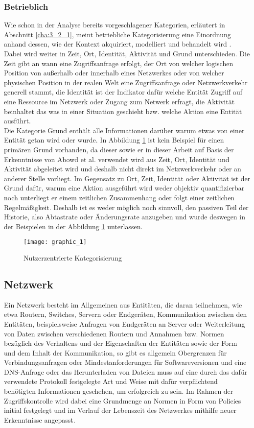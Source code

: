 \subsubsection{Betrieblich}
Wie schon in der Analyse bereits vorgeschlagener Kategorien, erläutert in Abschnitt \ref{cha:3_2_1}, meint betriebliche Kategorisierung  eine Einordnung anhand dessen, wie der Kontext akquiriert, modelliert und behandelt wird \cite{van2005context}.\\
Dabei wird weiter in Zeit, Ort, Identität, Aktivität und Grund unterschieden. Die Zeit gibt an wann eine Zugriffsanfrage erfolgt, der Ort von welcher logischen Position von außerhalb oder innerhalb eines Netzwerkes oder von welcher physischen Position in der realen Welt eine Zugriffsanfrage oder Netzwerkverkehr generell stammt, die Identität ist der Indikator dafür welche Entität Zugriff auf eine Ressource im Netzwerk oder Zugang zum Netwerk erfragt, die Aktivität beinhaltet das was in einer Situation geschieht bzw. welche Aktion eine Entität ausführt.\\
Die Kategorie Grund enthält alle Informationen darüber warum etwas von einer Entität getan wird oder wurde. In Abbildung \ref{Tax_1} ist kein Beispiel für einen primären Grund vorhanden, da dieser sowie er in dieser Arbeit auf Basis der Erkenntnisse von Abowd et al. \cite{abowd_towards_1999} verwendet wird aus Zeit, Ort, Identität und Aktivität abgeleitet wird und deshalb nicht direkt im Netzwerkverkehr oder an anderer Stelle vorliegt. Im Gegensatz zu Ort, Zeit, Identität oder Aktivität ist der Grund dafür, warum eine Aktion ausgeführt wird weder objektiv quantifizierbar noch unterliegt er einem zeitlichen Zusammenhang oder folgt einer zeitlichen Regelmäßigkeit. Deshalb ist es weder möglich noch sinnvoll, den passiven Teil der Historie, also Abtastrate oder Änderungsrate anzugeben und wurde deswegen in der Beispielen in der Abbildung \ref{Tax_1} unterlassen.
\begin{figure}[H]
\label{Tax_1}
\centering
\texttt{[image: graphic\_1]}
\caption{Nutzerzentrierte Kategorisierung}
\end{figure}
\subsection{Netzwerk}
Ein Netzwerk besteht im Allgemeinen aus Entitäten, die daran teilnehmen, wie etwa Routern, Switches, Servern oder Endgeräten, Kommunikation zwischen den Entitäten, beispielsweise Anfragen von Endgeräten an Server oder Weiterleitung von Daten zwischen verschiedenen Routern und Annahmen bzw. Normen bezüglich des Verhaltens und der Eigenschaften der Entitäten sowie der Form und dem Inhalt der Kommunikation, so gibt es allgemein Obergrenzen für Verbindungsanfragen oder Mindestanforderungen für Softwareversionen und eine DNS-Anfrage oder das Herunterladen von Dateien muss auf eine durch das dafür verwendete Protokoll festgelegte Art und Weise mit dafür verpflichtend benötigten Informationen geschehen, um erfolgreich zu sein.
Im Rahmen der Zugriffskontrolle wird dabei eine Grundmenge an Normen in Form von Policies initial festgelegt und im Verlauf der Lebenszeit des Netzwerkes mithilfe neuer Erkenntnisse angepasst.
